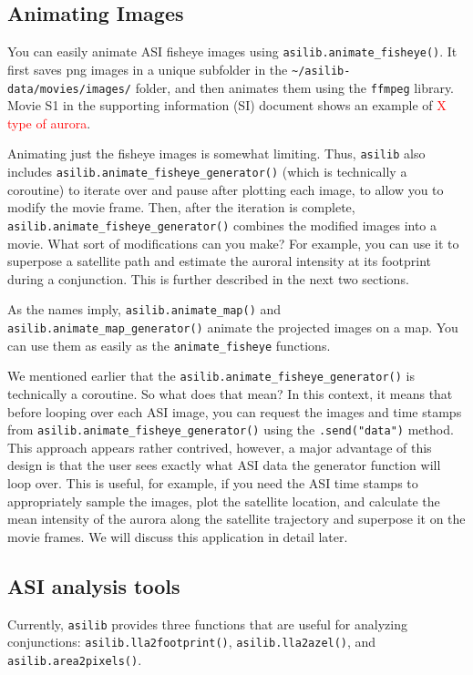 \documentclass[draft]{agujournal2019}
\begin{document}
\subsection{Animating Images}
You can easily animate ASI fisheye images using \verb|asilib.animate_fisheye()|. It first saves png images in a unique subfolder in the \verb|~/asilib-data/movies/images/| folder, and then animates them using the \verb|ffmpeg| library. Movie S1 in the supporting information (SI) document shows an example of \textcolor{red}{X type of aurora}.

Animating just the fisheye images is somewhat limiting. Thus, \verb|asilib| also includes \verb|asilib.animate_fisheye_generator()| (which is technically a coroutine) to iterate over and pause after plotting each image, to allow you to modify the movie frame. Then, after the iteration is complete, \verb|asilib.animate_fisheye_generator()| combines the modified images into a movie. What sort of modifications can you make? For example, you can use it to superpose a satellite path and estimate the auroral intensity at its footprint during a conjunction. This is further described in the next two sections.

As the names imply, \verb|asilib.animate_map()| and \verb|asilib.animate_map_generator()| animate the projected images on a map. You can use them as easily as the \verb|animate_fisheye| functions. 

We mentioned earlier that the \verb|asilib.animate_fisheye_generator()| is technically a coroutine. So what does that mean? In this context, it means that before looping over each ASI image, you can request the images and time stamps from \verb|asilib.animate_fisheye_generator()| using the \verb|.send("data")| method. This approach appears rather contrived, however, a major advantage of this design is that the user sees exactly what ASI data the generator function will loop over. This is useful, for example, if you need the ASI time stamps to appropriately sample the images, plot the satellite location, and calculate the mean intensity of the aurora along the satellite trajectory and superpose it on the movie frames. We will discuss this application in detail later.

\subsection{ASI analysis tools}
Currently, \verb|asilib| provides three functions that are useful for analyzing conjunctions: \verb|asilib.lla2footprint()|, \verb|asilib.lla2azel()|, and \verb|asilib.area2pixels()|.
\end{document}
